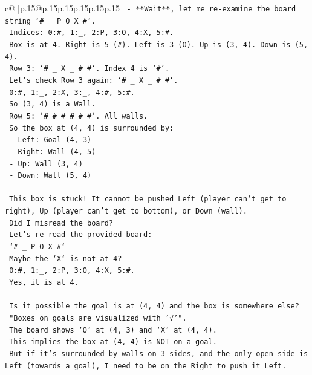 \documentclass{article}
\begin{document}
{\begin{supertabular}{c@{$\;$}|p{.15\linewidth}@{}p{.15\linewidth}p{.15\linewidth}p{.15\linewidth}p{.15\linewidth}p{.15\linewidth}}
{{{\texttt{   {-} **Wait**, let me re{-}examine the board string `\# \_ P O X \#`.} \\
\texttt{     Indices: 0:\#, 1:\_, 2:P, 3:O, 4:X, 5:\#.} \\
\texttt{     Box is at 4. Right is 5 (\#). Left is 3 (O). Up is (3, 4). Down is (5, 4).} \\
\texttt{     Row 3: `\# \_ X \_ \# \#`. Index 4 is `\#`.} \\
\texttt{     Let's check Row 3 again: `\# \_ X \_ \# \#`.} \\
\texttt{     0:\#, 1:\_, 2:X, 3:\_, 4:\#, 5:\#.} \\
\texttt{     So (3, 4) is a Wall.} \\
\texttt{     Row 5: `\# \# \# \# \# \#`. All walls.} \\
\texttt{     So the box at (4, 4) is surrounded by:} \\
\texttt{     {-} Left: Goal (4, 3)} \\
\texttt{     {-} Right: Wall (4, 5)} \\
\texttt{     {-} Up: Wall (3, 4)} \\
\texttt{     {-} Down: Wall (5, 4)} \\
\\ 
\texttt{     This box is stuck! It cannot be pushed Left (player can't get to right), Up (player can't get to bottom), or Down (wall).} \\
\texttt{     Did I misread the board?} \\
\texttt{     Let's re{-}read the provided board:} \\
\texttt{     `\# \_ P O X \#`} \\
\texttt{     Maybe the `X` is not at 4?} \\
\texttt{     0:\#, 1:\_, 2:P, 3:O, 4:X, 5:\#.} \\
\texttt{     Yes, it is at 4.} \\
\\ 
\texttt{     Is it possible the goal is at (4, 4) and the box is somewhere else?} \\
\texttt{     "Boxes on goals are visualized with '√'".} \\
\texttt{     The board shows `O` at (4, 3) and `X` at (4, 4).} \\
\texttt{     This implies the box at (4, 4) is NOT on a goal.} \\
\texttt{     But if it's surrounded by walls on 3 sides, and the only open side is Left (towards a goal), I need to be on the Right to push it Left.} \\
}}}
\end{supertabular}}
\end{document}
